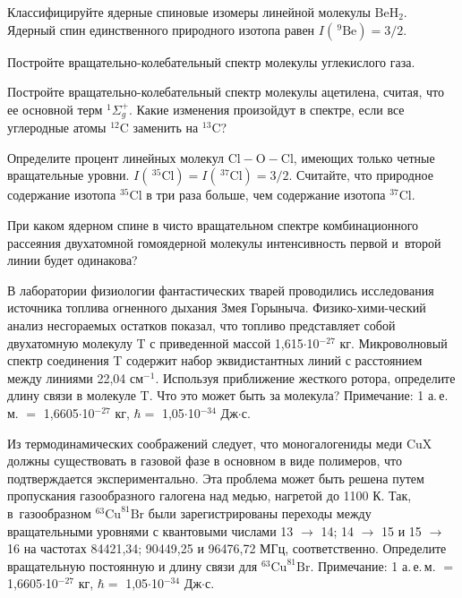  Классифицируйте ядерные спиновые изомеры линейной молекулы $\text{BeH}_2$. Ядерный спин единственного природного изотопа равен $I(\,^9\text{Be}) = 3/2$.
\par
{} Постройте вращательно-колебательный спектр молекулы углекислого газа.
\par
{} Постройте вращательно-колебательный спектр молекулы ацетилена, считая, что ее основной терм $^1\Sigma^+_g$. Какие изменения произойдут в спектре, если все углеродные атомы $^{12}\text{C}$ заменить на $^{13}\text{C}$?
\par
{} Определите процент линейных молекул $\text{Cl}-\text{O}-\text{Cl}$, имеющих только четные вращательные уровни. $I(\,^{35}\text{Cl}) = I(\,^{37}\text{Cl}) = 3/2$. Считайте, что природное содержание изотопа $^{35}\text{Cl}$ в три раза больше, чем содержание изотопа $^{37}\text{Cl}$.
\par
{} При каком ядерном спине в чисто вращательном спектре комбинационного рассеяния двухатомной гомоядерной молекулы интенсивность первой и~второй линии будет одинакова?
\par
{} В лаборатории физиологии фантастических тварей проводились исследования источника топлива огненного дыхания Змея Горыныча. Физико-хими-ческий анализ несгораемых остатков показал, что топливо представляет собой двухатомную молекулу T с приведенной массой 1,615$\cdot$10$^{-27}$ кг. Микроволновый спектр соединения T содержит набор эквидистантных линий с расстоянием между линиями 22,04 см$^{-1}$. Используя приближение жесткого ротора, определите длину связи в молекуле T. Что это может быть за молекула? Примечание: 1 а.\,е.\,м. $=$ 1,6605$\cdot$10$^{-27}$ кг, $\hbar =$ 1,05$\cdot$10$^{-34}$ Дж$\cdot$с.
\par
{} Из термодинамических соображений следует, что моногалогениды меди CuX должны существовать в газовой фазе в основном в виде полимеров, что подтверждается экспериментально. Эта проблема может быть решена путем пропускания газообразного галогена над медью, нагретой до 1100 К. Так, в~газообразном $^{63}\text{Cu}^{81}\text{Br}$ были зарегистрированы переходы между вращательными уровнями с квантовыми числами 13 $\rightarrow$ 14; 14 $\rightarrow$ 15 и 15 $\rightarrow$ 16 на частотах 84421,34; 90449,25 и 96476,72 МГц, соответственно. Определите вращательную постоянную и длину связи для $^{63}\text{Cu}^{81}\text{Br}$. Примечание: 1 а.\,е.\,м. $=$ 1,6605$\cdot$10$^{-27}$ кг, $\hbar =$ 1,05$\cdot$10$^{-34}$ Дж$\cdot$с.
\par
